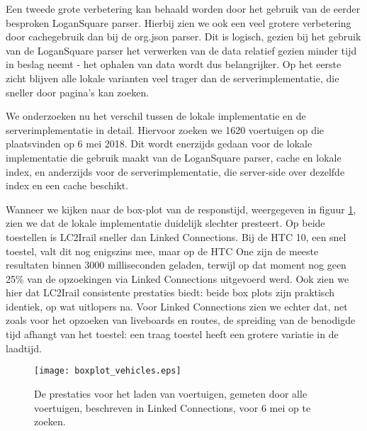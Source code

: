 Een tweede grote verbetering kan behaald worden door het gebruik van de eerder besproken LoganSquare parser. Hierbij zien we ook een veel grotere verbetering door cachegebruik dan bij de org.json parser. Dit is logisch, gezien bij het gebruik van de LoganSquare parser het verwerken van de data relatief gezien minder tijd in beslag neemt - het ophalen van data wordt dus belangrijker. Op het eerste zicht blijven alle lokale varianten veel trager dan de serverimplementatie, die sneller door pagina's kan zoeken.

We onderzoeken nu het verschil tussen de lokale implementatie en de serverimplementatie in detail. Hiervoor zoeken we 1620 voertuigen op die plaatsvinden op 6 mei 2018. Dit wordt enerzijds gedaan voor de lokale implementatie die gebruik maakt van de LoganSquare parser, cache en lokale index, en anderzijds voor de serverimplementatie, die server-side over dezelfde index en een cache beschikt.

Wanneer we kijken naar de box-plot van de responstijd, weergegeven in figuur \ref{fig:vehicleboxplot}, zien we dat de lokale implementatie duidelijk slechter presteert. Op beide toestellen is LC2Irail sneller dan Linked Connections. Bij de HTC 10, een snel toestel, valt dit nog enigszins mee, maar op de HTC One zijn de meeste resultaten binnen 3000 milliseconden geladen, terwijl op dat moment nog geen 25\% van de opzoekingen via Linked Connections uitgevoerd werd. Ook zien we hier dat LC2Irail consistente prestaties biedt: beide box plots zijn praktisch identiek, op wat uitlopers na. Voor Linked Connections zien we echter dat, net zoals voor het opzoeken van liveboards en routes, de spreiding van de benodigde tijd afhangt van het toestel: een traag toestel heeft een grotere variatie in de laadtijd.

\begin{figure}[h]
	\centering
	\texttt{[image: boxplot\_vehicles.eps]}
	\caption[Prestaties voor het laden van voertuigen]{De prestaties voor het laden van voertuigen, gemeten door alle voertuigen, beschreven in Linked Connections, voor 6 mei op te zoeken.}
	\label{fig:vehicleboxplot}
\end{figure}


